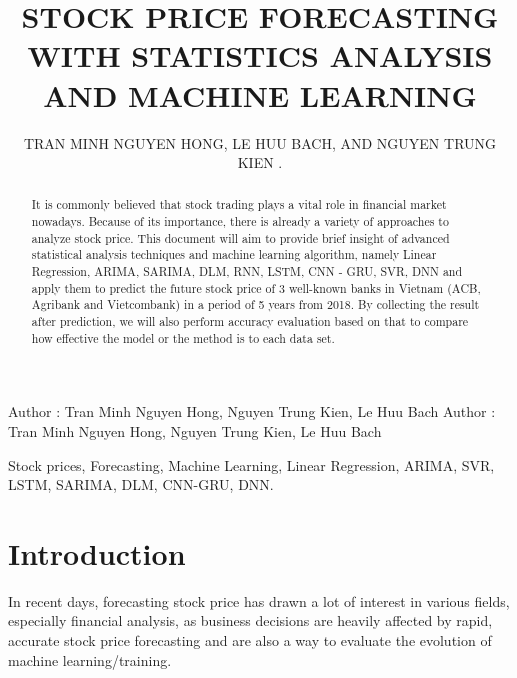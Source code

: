 \documentclass{ieeeojies}
\begin{document}
\title{STOCK PRICE FORECASTING WITH STATISTICS ANALYSIS AND MACHINE LEARNING}
\author{\uppercase{Tran minh nguyen hong},
\uppercase{Le Huu Bach, and Nguyen Trung Kien
}.}

\address[1]{University of Information Technology Ho Chi Minh City, Vietnam(e-mail: 21522107@gm.uit.edu.vn)}
\address[2]{University of Information Technology Ho Chi Minh City, Vietnam(e-mail: 21521844@gm.uit.edu.vn)}
\address[3]{University of Information Technology Ho Chi Minh City, Vietnam(e-mail: 21522247@gm.uit.edu.vn)}

\markboth
{Author \headeretal: Tran Minh Nguyen Hong, Nguyen Trung Kien, Le Huu Bach}
{Author \headeretal: Tran Minh Nguyen Hong, Nguyen Trung Kien, Le Huu Bach}



\begin{abstract}
It is commonly believed that stock trading plays a vital role in financial market nowadays. Because of its importance, there is already a variety of approaches to analyze stock price. This document will aim to provide brief insight of advanced statistical analysis techniques and machine learning algorithm, namely Linear Regression, ARIMA, SARIMA, DLM, RNN, LSTM, CNN - GRU, SVR, DNN and apply them to predict the future stock price of 3 well-known banks in Vietnam (ACB, Agribank and Vietcombank) in a period of 5 years from 2018. By collecting the result after prediction, we will also perform accuracy evaluation based on that to compare how effective the model or the method is to each data set. 
\end{abstract}

\begin{keywords}
Stock prices, Forecasting, Machine Learning, Linear Regression, ARIMA, SVR, LSTM, SARIMA, DLM, CNN-GRU, DNN.
\end{keywords}

\titlepgskip=-15pt

\maketitle

\section{Introduction}
\label{sec:introduction}
    \hspace{0.4cm}In recent days, forecasting stock price has drawn a lot of interest in various fields, especially financial analysis, as business decisions are heavily affected by rapid, accurate stock price forecasting and are also a way to evaluate the evolution of machine learning/training. 
    
\end{document}
